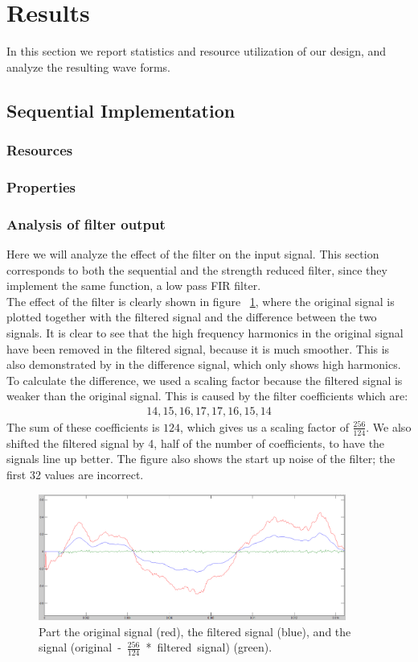\section{Results}
In this section we report statistics and resource utilization of our design, and analyze the resulting wave forms.
\subsection{Sequential Implementation}
\subsubsection{Resources}
\subsubsection{Properties}
\subsubsection{Analysis of filter output}
Here we will analyze the effect of the filter on the input signal. This section corresponds to both the sequential and the strength reduced filter, since they implement the same function, a low pass FIR filter.\\
The effect of the filter is clearly shown in figure  ~\ref{fig:diff}, where the original signal is plotted together with the filtered signal and the difference between the two signals. It is clear to see that the high frequency harmonics in the original signal have been removed in the filtered signal, because it is much smoother. This is also demonstrated by in the difference signal, which only shows high harmonics. To calculate the difference, we used a scaling factor because the filtered signal is weaker than the original signal. This is caused by the filter coefficients which are:
\begin{gather*}
14,15,16,17,17,16,15,14
\end{gather*}
The sum of these coefficients is $124$, which gives us a scaling factor of $\frac{256}{124}$. We also shifted the filtered signal by 4, half of the number of coefficients, to have the signals line up better. The figure also shows the start up noise of the filter; the first 32 values are incorrect.

\begin{figure}
\includegraphics[width=0.9\textwidth]{images/diff.png}
\caption{Part the original signal (red), the filtered signal (blue), and the signal \mbox{(original - $\frac{256}{124}$ * filtered signal)} (green).}
\label{fig:diff}
\end{figure}

